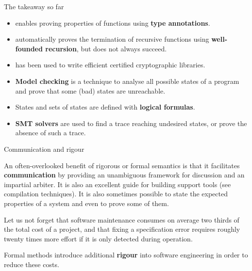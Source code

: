 \documentclass[compress,dvipdfmx]{beamer}
\begin{document}
\begin{frame}{The takeaway so far}

  \begin{itemize}

    \item \Fstar enables proving properties of functions using
      \textbf{type annotations}.

    \item \Fstar automatically proves the termination of recursive
      functions using \textbf{well-founded recursion}, but does not
      always succeed.

    \item \Fstar has been used to write efficient certified
      cryptographic libraries.

    \item \textbf{Model checking} is a technique to analyse all
      possible states of a program and prove that some (bad) states
      are unreachable.

    \item States and sets of states are defined with \textbf{logical
      formulas}.

    \item \textbf{SMT solvers} are used to find a trace reaching
      undesired states, or prove the absence of such a trace.


  \end{itemize}

\end{frame}

%
\begin{frame}{Communication and rigour}

  An often-overlooked benefit of rigorous or formal semantics is that
  it facilitates \textbf{communication} by providing an unambiguous
  framework for discussion and an impartial arbiter. It is also an
  excellent guide for building support tools (see compilation
  techniques). It is also sometimes possible to state the expected
  properties of a system and even to prove some of them.

  \bigskip

  Let us not forget that software maintenance consumes on average two
  thirds of the total cost of a project, and that fixing a
  specification error requires roughly twenty times more effort if it
  is only detected during operation.

  \bigskip

  Formal methods introduce additional \textbf{rigour} into software
  engineering in order to reduce these costs.

\end{frame}
\end{document}

